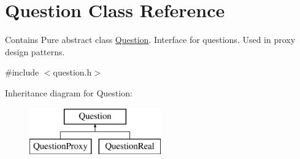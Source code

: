 \hypertarget{class_question}{}\section{Question Class Reference}
\label{class_question}


Contains Pure abstract class \hyperlink{class_question}{Question}. Interface for questions. Used in proxy design patterns.  




{\ttfamily \#include $<$question.\+h$>$}

Inheritance diagram for Question\+:\begin{figure}[H]
\begin{center}
\leavevmode
\includegraphics[height=2.000000cm]{class_question}
\end{center}
\end{figure}
